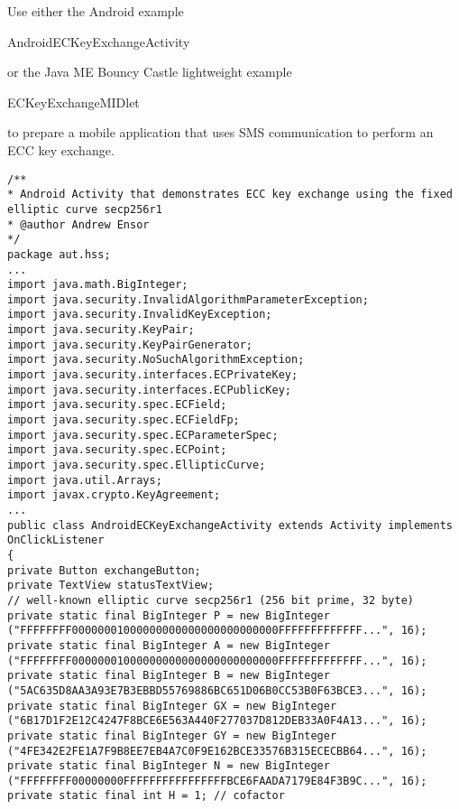 \begin{exercise}\label{Ex:AESEncryptionMobile}
	Use either the Android example\\
	 \begin{code}Andr\-oidECKeyExchangeActivity\end{code}
	or the Java ME Bouncy Castle lightweight example\\ \begin{code}ECKeyExchangeMIDlet\end{code}
	to prepare a mobile application that uses SMS communication to perform an ECC key exchange.
\end{exercise}

\begin{lstlisting}[caption=ECC key exchange]
/**
* Android Activity that demonstrates ECC key exchange using the fixed elliptic curve secp256r1
* @author Andrew Ensor
*/
package aut.hss;
...
import java.math.BigInteger;
import java.security.InvalidAlgorithmParameterException;
import java.security.InvalidKeyException;
import java.security.KeyPair;
import java.security.KeyPairGenerator;
import java.security.NoSuchAlgorithmException;
import java.security.interfaces.ECPrivateKey;
import java.security.interfaces.ECPublicKey;
import java.security.spec.ECField;
import java.security.spec.ECFieldFp;
import java.security.spec.ECParameterSpec;
import java.security.spec.ECPoint;
import java.security.spec.EllipticCurve;
import java.util.Arrays;
import javax.crypto.KeyAgreement;
...
public class AndroidECKeyExchangeActivity extends Activity implements
OnClickListener
{
private Button exchangeButton;
private TextView statusTextView;
// well-known elliptic curve secp256r1 (256 bit prime, 32 byte)
private static final BigInteger P = new BigInteger
("FFFFFFFF00000001000000000000000000000000FFFFFFFFFFFFF...", 16);
private static final BigInteger A = new BigInteger
("FFFFFFFF00000001000000000000000000000000FFFFFFFFFFFFF...", 16);
private static final BigInteger B = new BigInteger
("5AC635D8AA3A93E7B3EBBD55769886BC651D06B0CC53B0F63BCE3...", 16);
private static final BigInteger GX = new BigInteger
("6B17D1F2E12C4247F8BCE6E563A440F277037D812DEB33A0F4A13...", 16);
private static final BigInteger GY = new BigInteger
("4FE342E2FE1A7F9B8EE7EB4A7C0F9E162BCE33576B315ECECBB64...", 16);
private static final BigInteger N = new BigInteger
("FFFFFFFF00000000FFFFFFFFFFFFFFFFBCE6FAADA7179E84F3B9C...", 16);
private static final int H = 1; // cofactor


\end{lstlisting}
